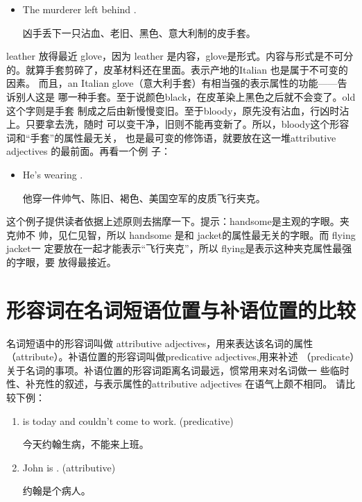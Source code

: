 \begin{itemize}
\item The murderer left behind .

  凶手丢下一只沾血、老旧、黑色、意大利制的皮手套。
\end{itemize}

leather 放得最近 glove，因为 leather 是内容，glove是形式。内容与形式是不可分
的。就算手套剪碎了，皮革材料还在里面。表示产地的Italian 也是属于不可变的因素。
而且，an Italian glove（意大利手套）有相当强的表示属性的功能——告诉别人这是
哪一种手套。至于说颜色black，在皮革染上黑色之后就不会变了。old这个字则是手套
制成之后由新慢慢变旧。至于bloody，原先没有沾血，行凶时沾上。只要拿去洗，随时
可以变干净，旧则不能再变新了。所以，bloody这个形容词和“手套”的属性最无关，
也是最可变的修饰语，就要放在这一堆attributive adjectives 的最前面。再看一个例
子：
\begin{itemize}
\item He's wearing .

  他穿一件帅气、陈旧、褐色、美国空军的皮质飞行夹克。
\end{itemize}

这个例子提供读者依据上述原则去揣摩一下。提示：handsome是主观的字眼。夹克帅不
帅，见仁见智，所以 handsome 是和 jacket的属性最无关的字眼。而 flying jacket一
定要放在一起才能表示“飞行夹克”，所以 flying是表示这种夹克属性最强的字眼，要
放得最接近。

\section{形容词在名词短语位置与补语位置的比较}

名词短语中的形容词叫做 attributive adjectives，用来表达该名词的属性
（attribute）。补语位置的形容词叫做predicative adjectives,用来补述
（predicate）关于名词的事项。补语位置的形容词距离名词最远，惯常用来对名词做一
些临时性、补充性的叙述，与表示属性的attributive adjectives 在语气上颇不相同。
请比较下例：

\begin{enumerate}
\item  {} is  today and couldn't come to work. (predicative)


  今天约翰生病，不能来上班。
\item  John is . (attributive)

  约翰是个病人。
\end{enumerate}

